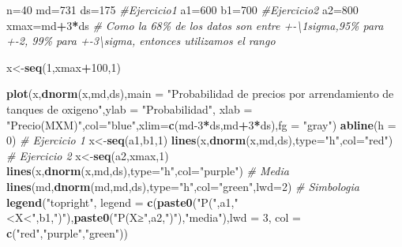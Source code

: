 \documentclass[
]{article}
\newenvironment{Shaded}{\begin{snugshade}}{\end{snugshade}}
\newcommand{\AttributeTok}[1]{\textcolor[rgb]{0.13,0.29,0.53}{#1}}
\newcommand{\CommentTok}[1]{\textcolor[rgb]{0.56,0.35,0.01}{\textit{#1}}}
\newcommand{\DecValTok}[1]{\textcolor[rgb]{0.00,0.00,0.81}{#1}}
\newcommand{\FunctionTok}[1]{\textcolor[rgb]{0.13,0.29,0.53}{\textbf{#1}}}
\newcommand{\NormalTok}[1]{#1}
\newcommand{\OtherTok}[1]{\textcolor[rgb]{0.56,0.35,0.01}{#1}}
\newcommand{\SpecialCharTok}[1]{\textcolor[rgb]{0.81,0.36,0.00}{\textbf{#1}}}
\newcommand{\StringTok}[1]{\textcolor[rgb]{0.31,0.60,0.02}{#1}}
\begin{document}
\begin{Shaded}
\begin{Highlighting}[]
\NormalTok{n}\OtherTok{=}\DecValTok{40}
\NormalTok{md}\OtherTok{=}\DecValTok{731}
\NormalTok{ds}\OtherTok{=}\DecValTok{175}
\CommentTok{\#Ejercicio1}
\NormalTok{a1}\OtherTok{=}\DecValTok{600}
\NormalTok{b1}\OtherTok{=}\DecValTok{700}
\CommentTok{\#Ejercicio2}
\NormalTok{a2}\OtherTok{=}\DecValTok{800}
\NormalTok{xmax}\OtherTok{=}\NormalTok{md}\SpecialCharTok{+}\DecValTok{3}\SpecialCharTok{*}\NormalTok{ds }\CommentTok{\# Como la 68\% de los datos son entre +{-}\textbackslash{}1sigma,95\% para +{-}2, 99\% para +{-}3\textbackslash{}sigma, entonces utilizamos el rango}

\NormalTok{x}\OtherTok{\textless{}{-}}\FunctionTok{seq}\NormalTok{(}\DecValTok{1}\NormalTok{,xmax}\SpecialCharTok{+}\DecValTok{100}\NormalTok{,}\DecValTok{1}\NormalTok{) }

\FunctionTok{plot}\NormalTok{(x,}\FunctionTok{dnorm}\NormalTok{(x,md,ds),}\AttributeTok{main =} \StringTok{"Probabilidad de precios por arrendamiento de tanques de oxigeno"}\NormalTok{,}\AttributeTok{ylab =} \StringTok{"Probabilidad"}\NormalTok{, }\AttributeTok{xlab =} \StringTok{"Precio(MXM)"}\NormalTok{,}\AttributeTok{col=}\StringTok{"blue"}\NormalTok{,}\AttributeTok{xlim=}\FunctionTok{c}\NormalTok{(md}\DecValTok{{-}3}\SpecialCharTok{*}\NormalTok{ds,md}\SpecialCharTok{+}\DecValTok{3}\SpecialCharTok{*}\NormalTok{ds),}\AttributeTok{fg =} \StringTok{"gray"}\NormalTok{)}
\FunctionTok{abline}\NormalTok{(}\AttributeTok{h =} \DecValTok{0}\NormalTok{)}
\CommentTok{\# Ejercicio 1}
\NormalTok{x}\OtherTok{\textless{}{-}}\FunctionTok{seq}\NormalTok{(a1,b1,}\DecValTok{1}\NormalTok{)}
\FunctionTok{lines}\NormalTok{(x,}\FunctionTok{dnorm}\NormalTok{(x,md,ds),}\AttributeTok{type=}\StringTok{"h"}\NormalTok{,}\AttributeTok{col=}\StringTok{"red"}\NormalTok{)}
\CommentTok{\# Ejercicio 2}
\NormalTok{x}\OtherTok{\textless{}{-}}\FunctionTok{seq}\NormalTok{(a2,xmax,}\DecValTok{1}\NormalTok{)}
\FunctionTok{lines}\NormalTok{(x,}\FunctionTok{dnorm}\NormalTok{(x,md,ds),}\AttributeTok{type=}\StringTok{"h"}\NormalTok{,}\AttributeTok{col=}\StringTok{"purple"}\NormalTok{)}
\CommentTok{\# Media}
\FunctionTok{lines}\NormalTok{(md,}\FunctionTok{dnorm}\NormalTok{(md,md,ds),}\AttributeTok{type=}\StringTok{"h"}\NormalTok{,}\AttributeTok{col=}\StringTok{"green"}\NormalTok{,}\AttributeTok{lwd=}\DecValTok{2}\NormalTok{)}
\CommentTok{\# Simbologia}
\FunctionTok{legend}\NormalTok{(}\StringTok{"topright"}\NormalTok{, }\AttributeTok{legend =} \FunctionTok{c}\NormalTok{(}\FunctionTok{paste0}\NormalTok{(}\StringTok{"P("}\NormalTok{,a1,}\StringTok{"\textless{}X\textless{}"}\NormalTok{,b1,}\StringTok{")"}\NormalTok{),}\FunctionTok{paste0}\NormalTok{(}\StringTok{"P(X≥"}\NormalTok{,a2,}\StringTok{")"}\NormalTok{),}\StringTok{"media"}\NormalTok{),}\AttributeTok{lwd =} \DecValTok{3}\NormalTok{, }\AttributeTok{col =} \FunctionTok{c}\NormalTok{(}\StringTok{"red"}\NormalTok{,}\StringTok{"purple"}\NormalTok{,}\StringTok{"green"}\NormalTok{))}
\end{Highlighting}
\end{Shaded}
\end{document}
